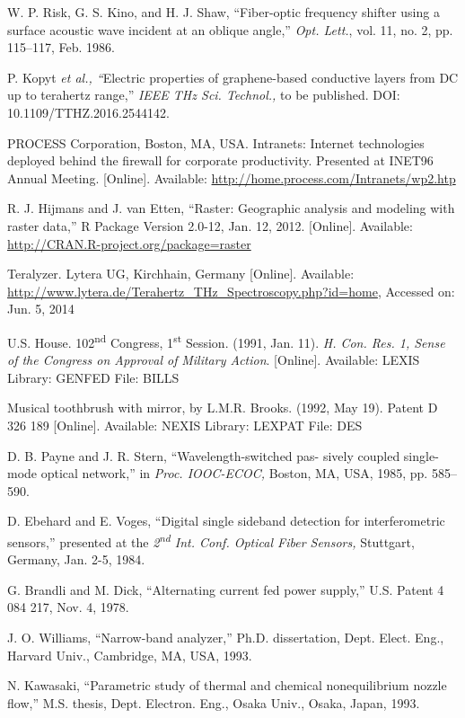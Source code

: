 \documentclass{ieeeaccess}
\begin{document}
\begin{thebibliography}{00}
 W. P. Risk, G. S. Kino, and H. J. Shaw, ``Fiber-optic frequency shifter using a surface acoustic wave incident at an oblique angle,'' \emph{Opt. Lett.}, vol. 11, no. 2, pp. 115--117, Feb. 1986.

 P. Kopyt \emph{et al., ``}Electric properties of graphene-based conductive layers from DC up to terahertz range,'' \emph{IEEE THz Sci. Technol.,} to be published. DOI: 10.1109/TTHZ.2016.2544142.

 PROCESS Corporation, Boston, MA, USA. Intranets:
Internet technologies deployed behind the firewall for corporate
productivity. Presented at INET96 Annual Meeting. [Online].
Available: \underline{http://home.process.com/Intranets/wp2.htp}

 R. J. Hijmans and J. van Etten, ``Raster: Geographic analysis and modeling with raster data,'' R Package Version 2.0-12, Jan. 12, 2012. [Online]. Available: \underline {http://CRAN.R-project.org/package=raster} 

 Teralyzer. Lytera UG, Kirchhain, Germany [Online].
Available:
\underline{http://www.lytera.de/Terahertz\_THz\_Spectroscopy.php?id=home}, Accessed on: Jun. 5, 2014

 U.S. House. 102\textsuperscript{nd} Congress, 1\textsuperscript{st} Session. (1991, Jan. 11). \emph{H. Con. Res. 1, Sense of the Congress on Approval of}  \emph{Military Action}. [Online]. Available: LEXIS Library: GENFED File: BILLS

 Musical toothbrush with mirror, by L.M.R. Brooks. (1992, May 19). Patent D 326 189 [Online]. Available: NEXIS Library: LEXPAT File: DES

 D. B. Payne and J. R. Stern, ``Wavelength-switched pas- sively coupled single-mode optical network,'' in \emph{Proc. IOOC-ECOC,} Boston, MA, USA, 1985, pp. 585--590.

 D. Ebehard and E. Voges, ``Digital single sideband detection for interferometric sensors,'' presented at the \emph{2\textsuperscript{nd} Int. Conf. Optical Fiber Sensors,} Stuttgart, Germany, Jan. 2-5, 1984.

 G. Brandli and M. Dick, ``Alternating current fed power supply,'' U.S. Patent 4 084 217, Nov. 4, 1978.

 J. O. Williams, ``Narrow-band analyzer,'' Ph.D. dissertation, Dept. Elect. Eng., Harvard Univ., Cambridge, MA, USA, 1993.

 N. Kawasaki, ``Parametric study of thermal and chemical nonequilibrium nozzle flow,'' M.S. thesis, Dept. Electron. Eng., Osaka Univ., Osaka, Japan, 1993.


\end{thebibliography}
\end{document}
